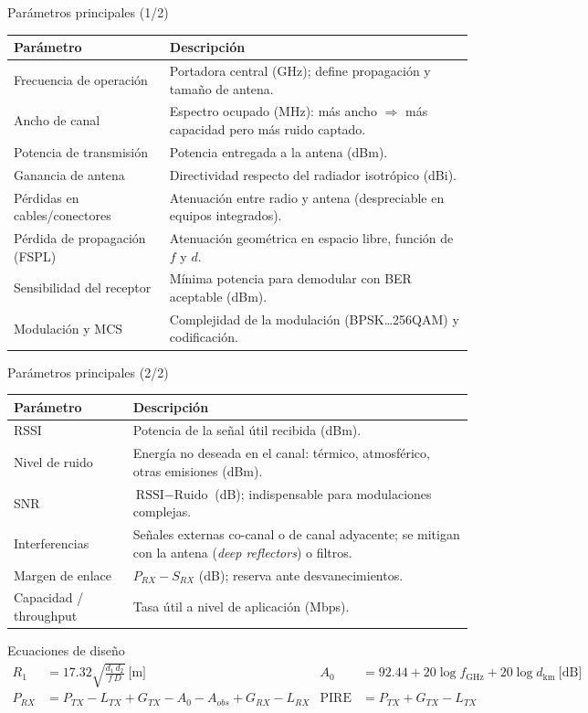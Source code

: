 \begin{frame}{Parámetros principales (1/2)}
  \small
  \begin{tabularx}{\textwidth}{@{}p{3.6cm}L@{}}
    \toprule
    \textbf{Parámetro} & \textbf{Descripción} \\ \midrule
    Frecuencia de operación & Portadora central (GHz); define propagación y tamaño de antena. \\
    Ancho de canal & Espectro ocupado (MHz): más ancho $\Rightarrow$ más capacidad pero más ruido captado. \\
    Potencia de transmisión & Potencia entregada a la antena (dBm). \\
    Ganancia de antena & Directividad respecto del radiador isotrópico (dBi). \\
    Pérdidas en cables/conectores & Atenuación entre radio y antena (despreciable en equipos integrados). \\
    Pérdida de propagación (FSPL) & Atenuación geométrica en espacio libre, función de $f$ y $d$. \\
    Sensibilidad del receptor & Mínima potencia para demodular con BER aceptable (dBm). \\
    Modulación y MCS & Complejidad de la modulación (BPSK\dots256QAM) y codificación. \\
    \bottomrule
  \end{tabularx}
\end{frame}

\begin{frame}{Parámetros principales (2/2)}
  \small
  \begin{tabularx}{\textwidth}{@{}p{3.6cm}L@{}}
    \toprule
    \textbf{Parámetro} & \textbf{Descripción} \\ \midrule
    RSSI & Potencia de la señal útil recibida (dBm). \\
    Nivel de ruido & Energía no deseada en el canal: térmico, atmosférico, otras emisiones (dBm). \\
    SNR & $\text{RSSI} - \text{Ruido}$ (dB); indispensable para modulaciones complejas. \\
    Interferencias & Señales externas co-canal o de canal adyacente; se mitigan con la antena (\emph{deep reflectors}) o filtros. \\
    Margen de enlace & $P_{RX} - S_{RX}$ (dB); reserva ante desvanecimientos. \\
    Capacidad / throughput & Tasa útil a nivel de aplicación (Mbps). \\
    \bottomrule
  \end{tabularx}
  \vspace{6pt}
  \begin{block}{Ecuaciones de diseño}
    \vspace{-8pt}
    \begin{align*}
      R_1 &= 17.32\sqrt{\frac{d_1\,d_2}{f\,D}}\ \text{[m]} &
      A_0 &= 92.44 + 20\log f_{\text{GHz}} + 20\log d_{\text{km}}\ \text{[dB]}\\
      P_{RX} &= P_{TX} - L_{TX} + G_{TX} - A_0 - A_{obs} + G_{RX} - L_{RX} &
      \text{PIRE} &= P_{TX} + G_{TX} - L_{TX}
    \end{align*}
  \end{block}
\end{frame}
